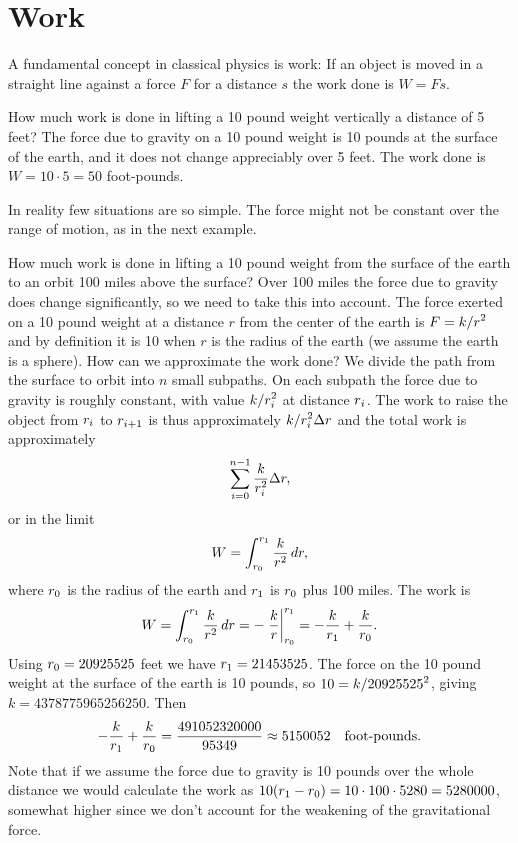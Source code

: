 \section{Work}{}{}
\nobreak
A fundamental concept in classical physics is {\dfont
work\/}: If an object is moved in a straight line against
a force $F$ for a distance $s$ the work done is $W=Fs$.

\example
How much work is done in lifting a 10 pound weight vertically a
distance of 5 feet? The force due to gravity on a 10 pound weight is
10 pounds at the surface of the earth, and it does not change
appreciably over 5 feet. The work done is $W=10\cdot 5=50$ foot-pounds.
\endexample

In reality few situations are so simple. The force might not be
constant over the range of motion, as in the next example.

\example How much work is done in lifting a 10 pound weight from the
surface of the earth to an orbit 100 miles above the surface? Over 100
miles the force due to gravity does change significantly, so we need
to take this into account. The force exerted on a 10 pound weight at a
distance $r$ from the center of the earth is $\displaystyle F=k/r^2$ and by
definition it is 10 when $r$ is the radius of the earth (we assume the
earth is a sphere). How can we approximate the work done? We divide
the path from the surface to orbit into $n$ small subpaths. On each
subpath the force due to gravity is roughly constant, with value
$\displaystyle k/r_i^2$ at distance $\displaystyle r_i$. The work to raise the object from
$\displaystyle r_i$ to $\displaystyle r_{i+1}$ is thus approximately $\displaystyle k/r_i^2\Delta r$ and the
total work is approximately
$$\sum_{i=0}^{n-1} {k\over r_i^2}\Delta r,$$
or in the limit
$$W=\int_{r_0}^{r_1} {k\over r^2}\,dr,$$
where $\displaystyle r_0$ is the radius of the earth and $\displaystyle r_1$ is $\displaystyle r_0$ plus 100
miles. The work is
$$W=\int_{r_0}^{r_1} {k\over r^2}\,dr=
-\left.{k\over r}\right|_{r_0}^{r_1}=-{k\over r_1}+{k\over r_0}.$$
Using $\displaystyle r_0=20925525$ feet we have $\displaystyle r_1=21453525$. The force on the 10
pound weight at the surface of the earth is 10 pounds, so 
$\displaystyle 10=k/20925525^2$, giving $k=4378775965256250$. Then
$$-{k\over r_1}+{k\over r_0}={491052320000\over 95349}\approx 5150052
\quad\hbox{foot-pounds}.$$
Note that if we assume the force due to gravity is 10 pounds over the
whole distance we would calculate the work as $\displaystyle 10(r_1-r_0)=10\cdot100\cdot
5280=5280000$, somewhat higher since we don't account for the
weakening of the gravitational force.
\endexample


